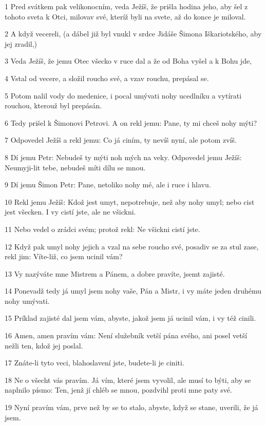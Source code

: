 \par 1 Pred svátkem pak velikonocním, veda Ježíš, že prišla hodina jeho, aby šel z tohoto sveta k Otci, milovav své, kteríž byli na svete, až do konce je miloval.
\par 2 A když vecereli, (a dábel již byl vnukl v srdce Jidáše Šimona Iškariotského, aby jej zradil,)
\par 3 Veda Ježíš, že jemu Otec všecko v ruce dal a že od Boha vyšel a k Bohu jde,
\par 4 Vstal od vecere, a složil roucho své, a vzav rouchu, prepásal se.
\par 5 Potom nalil vody do medenice, i pocal umývati nohy ucedlníku a vytírati rouchou, kterouž byl prepásán.
\par 6 Tedy prišel k Šimonovi Petrovi. A on rekl jemu: Pane, ty mi chceš nohy mýti?
\par 7 Odpovedel Ježíš a rekl jemu: Co já ciním, ty nevíš nyní, ale potom zvíš.
\par 8 Dí jemu Petr: Nebudeš ty mýti noh mých na veky. Odpovedel jemu Ježíš: Neumyji-lit tebe, nebudeš míti dílu se mnou.
\par 9 Dí jemu Šimon Petr: Pane, netoliko nohy mé, ale i ruce i hlavu.
\par 10 Rekl jemu Ježíš: Kdož jest umyt, nepotrebuje, než aby nohy umyl; nebo cist jest všecken. I vy cistí jste, ale ne všickni.
\par 11 Nebo vedel o zrádci svém; protož rekl: Ne všickni cistí jste.
\par 12 Když pak umyl nohy jejich a vzal na sebe roucho své, posadiv se za stul zase, rekl jim: Víte-liž, co jsem ucinil vám?
\par 13 Vy nazýváte mne Mistrem a Pánem, a dobre pravíte, jsemt zajisté.
\par 14 Ponevadž tedy já umyl jsem nohy vaše, Pán a Mistr, i vy máte jeden druhému nohy umývati.
\par 15 Príklad zajisté dal jsem vám, abyste, jakož jsem já ucinil vám, i vy též cinili.
\par 16 Amen, amen pravím vám: Není služebník vetší pána svého, ani posel vetší nežli ten, kdož jej poslal.
\par 17 Znáte-li tyto veci, blahoslavení jste, budete-li je ciniti.
\par 18 Ne o všecht vás pravím. Já vím, které jsem vyvolil, ale musí to býti, aby se naplnilo písmo: Ten, jenž jí chléb se mnou, pozdvihl proti mne paty své.
\par 19 Nyní pravím vám, prve než by se to stalo, abyste, když se stane, uverili, že já jsem.
